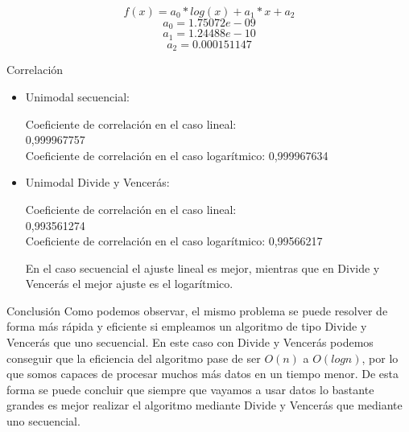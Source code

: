 \documentclass[12pt]{beamer}
\begin{document}
\begin{frame}
\[
f(x)=a_0*log(x)+a_1*x+a_2
\]
\[
a_0=1.75072e-09
\]
\[
a_1=1.24488e-10
\]
\[
a_2=0.000151147 
\]
\end{frame}

\begin{frame}{Correlación}
\begin{itemize}
\item Unimodal secuencial:

	Coeficiente de correlación en el caso lineal: \\
	0,999967757\\
	Coeficiente de correlación en el caso logarítmico: 
	0,999967634
	
\vspace{3mm} %

\item Unimodal Divide y Vencerás:

	Coeficiente de correlación en el caso lineal: \\
	0,993561274\\
	Coeficiente de correlación en el caso logarítmico: 
	0,99566217
	
\vspace{5mm} %

En el caso secuencial el ajuste lineal es mejor, mientras que en Divide y Vencerás el mejor ajuste es el logarítmico. 
\end{itemize}
\end{frame}

\begin{frame}{Conclusión}
Como podemos observar, el mismo problema se puede resolver de forma más rápida y eficiente si empleamos un algoritmo de tipo Divide y Vencerás que uno secuencial.
\vspace{5mm} %
En este caso con Divide y Vencerás podemos conseguir que la eficiencia del algoritmo pase de ser $O(n)$ a $O(log n)$, por lo que somos capaces de procesar muchos más datos en un tiempo menor. 
\vspace{5mm} %
De esta forma se puede concluir que siempre que vayamos a usar datos lo bastante grandes es mejor realizar el algoritmo mediante Divide y Vencerás que mediante uno secuencial. 
\end{frame}
\end{document}
